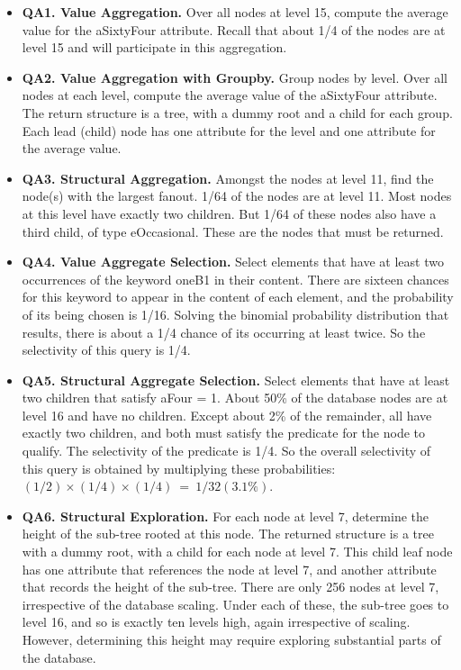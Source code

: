 \begin {itemize}
\item {\bf QA1. Value Aggregation.} Over all nodes at level 15, compute the average
value for the {\sf aSixtyFour} attribute.  Recall that about 1/4 of the nodes
are at level 15 and will participate in this aggregation.

\item {\bf QA2. Value Aggregation with Groupby.} Group nodes by level.  Over all
nodes at each level, compute the average value of the {\sf aSixtyFour}
attribute.  The return structure is a tree, with a dummy root and a child for
each group.  Each lead (child) node has one attribute for the level and one
attribute for the average value.

\item {\bf QA3. Structural Aggregation.} Amongst the nodes at level 11,
find the node(s) with the largest fanout.  1/64 of the nodes are at level
11.  Most nodes at this level have exactly two children.  But 1/64 of these
nodes also have a third child, of type {\sf eOccasional}.  These are the
nodes that must be returned.

\item {\bf QA4. Value Aggregate Selection.} Select elements that have at
least two occurrences of the keyword {\sf oneB1} in their content.
There are sixteen chances for this keyword to appear in the content of each
element, and the probability of its being chosen is 1/16.  Solving the
binomial probability distribution that results, there is about a 1/4 chance
of its occurring at least twice.  So the selectivity of this query is 1/4.

\item {\bf QA5. Structural Aggregate Selection.} Select elements that have at
least two children that satisfy {\sf aFour = 1}.
About 50\% of the database nodes are at level 16 and have no children.
Except about 2\% of the remainder, all have exactly two children, and both
must satisfy the predicate for the node to qualify.
The selectivity of the predicate is 1/4.  So the overall
selectivity of this query is obtained by multiplying these probabilities:
$(1/2) \times (1/4) \times (1/4) ~=~ 1/32 (3.1\%)$.

\item {\bf QA6. Structural Exploration.} For each node at level 7, determine
the height of the sub-tree rooted at this node.  The returned structure is a
tree with a dummy root, with a child for each node at level 7.  This child
leaf node has one attribute that references the node at level 7, and another
attribute that records the height of the sub-tree.
There are only 256 nodes at
level 7, irrespective of the database scaling.  Under each of these, the
sub-tree goes to level 16, and so is exactly ten levels high, again
irrespective of scaling.  However, determining this height may require
exploring substantial parts of the database.
\end {itemize}

